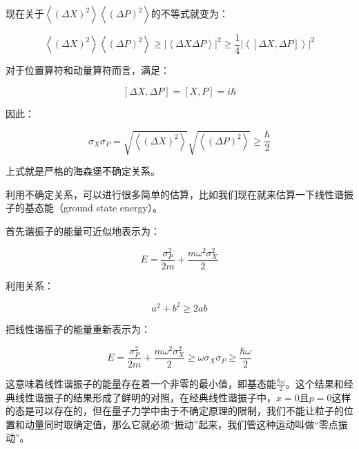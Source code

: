 现在关于$\left\langle \left( \Delta X \right)^2  \right\rangle \left\langle \left( \Delta P \right)^2  \right\rangle$的不等式就变为：

\begin{equation*}
\left\langle \left( \Delta X \right)^2  \right\rangle \left\langle \left( \Delta P \right)^2  \right\rangle \ge \left|  \left\langle \Delta X \Delta P \right\rangle  \right|^2 \ge \frac{1}{4} \left| { \left\langle { \left[ \Delta X, \Delta P \right] } \right\rangle } \right|^2
\end{equation*}

对于位置算符和动量算符而言，满足：

\begin{equation*}
\left[ \Delta X, \Delta P \right] = \left[ X, P \right] = i \hbar
\end{equation*}

因此：

\begin{equation}
\sigma_X \sigma_P = \sqrt{ \left\langle \left( \Delta X \right)^2 \right\rangle } \sqrt{ \left\langle \left( \Delta P \right)^2  \right\rangle }  \ge \frac{\hbar}{2}
\end{equation}

上式就是严格的海森堡不确定关系。

利用不确定关系，可以进行很多简单的估算，比如我们现在就来估算一下线性谐振子的基态能（ground state energy）。

首先谐振子的能量可近似地表示为：

\begin{equation}
E = \frac{\sigma_P^2 }{2m} + \frac{m \omega^2 \sigma_X^2}{2}
\end{equation}

利用关系：

\begin{equation}
a^2 + b^2 \ge 2 a b
\end{equation}

把线性谐振子的能量重新表示为：

\begin{equation}
E = \frac{\sigma_P^2 }{2m} + \frac{m \omega^2 \sigma_X^2}{2} \ge \omega \sigma_X \sigma_P \ge \frac{\hbar \omega}{2}
\end{equation}

这意味着线性谐振子的能量存在着一个非零的最小值，即基态能$\frac{\hbar \omega}{2}$。这个结果和经典线性谐振子的结果形成了鲜明的对照，在经典线性谐振子中，$x = 0$且$p=0$这样的态是可以存在的，但在量子力学中由于不确定原理的限制，我们不能让粒子的位置和动量同时取确定值，那么它就必须“振动”起来，我们管这种运动叫做“零点振动”。

